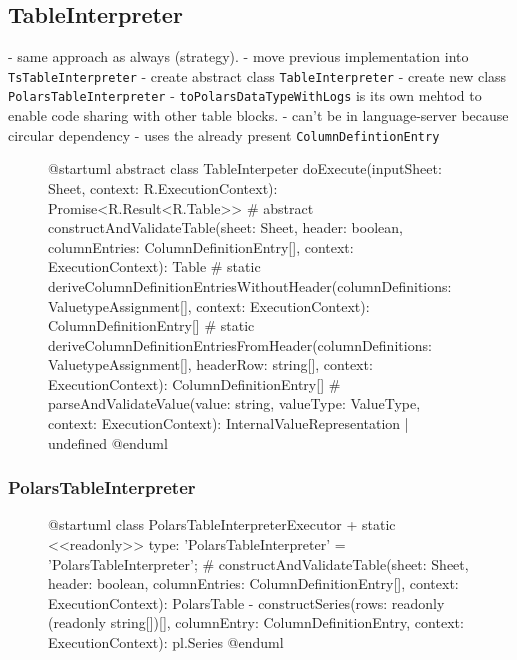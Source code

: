 \subsection{TableInterpreter}
- same approach as always (strategy).
- move previous implementation into \Verb|TsTableInterpreter|
- create abstract class \Verb|TableInterpreter|
- create new class \Verb|PolarsTableInterpreter|
- \Verb|toPolarsDataTypeWithLogs| is its own mehtod to enable code sharing with other table blocks.
- can't be in language-server because circular dependency
- uses the already present \Verb|ColumnDefintionEntry|

\begin{figure}
	\begin{plantuml}
		@startuml
		abstract class TableInterpeter {
		doExecute(inputSheet: Sheet, context: R.ExecutionContext): Promise<R.Result<R.Table>>
		# {abstract} constructAndValidateTable(sheet: Sheet, header: boolean, columnEntries: ColumnDefinitionEntry[], context: ExecutionContext): Table
		# {static} deriveColumnDefinitionEntriesWithoutHeader(columnDefinitions: ValuetypeAssignment[], context: ExecutionContext): ColumnDefinitionEntry[]
		# {static} deriveColumnDefinitionEntriesFromHeader(columnDefinitions: ValuetypeAssignment[], headerRow: string[], context: ExecutionContext): ColumnDefinitionEntry[]
		# parseAndValidateValue(value: string, valueType: ValueType, context: ExecutionContext): InternalValueRepresentation | undefined
		}
		@enduml
	\end{plantuml}
	\caption{}
	\label{fig:uml:tableinterpreter}
\end{figure}

\subsubsection{PolarsTableInterpreter}
\begin{figure}
	\begin{plantuml}
		@startuml
		class PolarsTableInterpreterExecutor {
		+ {static} <<readonly>> type: 'PolarsTableInterpreter' = 'PolarsTableInterpreter';
		# constructAndValidateTable(sheet: Sheet, header: boolean, columnEntries: ColumnDefinitionEntry[], context: ExecutionContext): PolarsTable
		- constructSeries(rows: readonly (readonly string[])[], columnEntry: ColumnDefinitionEntry, context: ExecutionContext): pl.Series
		}
		@enduml
	\end{plantuml}
	\caption{}\label{fig:uml:polarstableinterpreter}
\end{figure}


